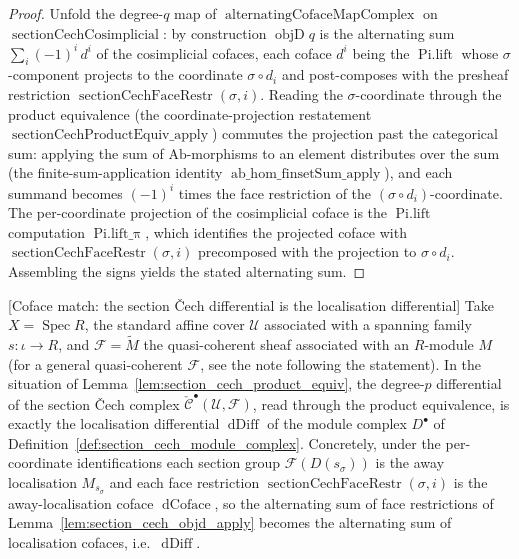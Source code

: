 \begin{proof}
  Unfold the degree-\(q\) map of \(\operatorname{alternatingCofaceMapComplex}\) on
  \(\operatorname{sectionCechCosimplicial}\): by construction \(\operatorname{objD} q\)
  is the alternating sum \(\sum_{i} (-1)^i\, d^i\) of the cosimplicial cofaces, each
  coface \(d^i\) being the \(\operatorname{Pi.lift}\) whose \(\sigma\)-component
  projects to the coordinate \(\sigma \circ d_i\) and post-composes with the presheaf
  restriction \(\operatorname{sectionCechFaceRestr}(\sigma, i)\). Reading the
  \(\sigma\)-coordinate through the product equivalence (the coordinate-projection
  restatement \(\operatorname{sectionCechProductEquiv\_apply}\)) commutes the projection
  past the categorical sum: applying the sum of \(\mathrm{Ab}\)-morphisms to an element
  distributes over the sum (the finite-sum-application identity
  \(\operatorname{ab\_hom\_finsetSum\_apply}\)), and each summand becomes
  \((-1)^i\) times the face restriction of the \((\sigma \circ d_i)\)-coordinate. The
  per-coordinate projection of the cosimplicial coface is the \(\operatorname{Pi.lift}\)
  computation \(\operatorname{Pi.lift\_π}\), which identifies the projected coface with
  \(\operatorname{sectionCechFaceRestr}(\sigma, i)\) precomposed with the projection to
  \(\sigma \circ d_i\). Assembling the signs yields the stated alternating sum.
\end{proof}

\begin{lemma}

[Coface match: the section {\v C}ech differential is the localisation differential]
  \label{lem:section_cech_coface_match}
  Take \(X = \operatorname{Spec} R\), the standard affine cover \(\mathcal{U}\)
  associated with a spanning family \(s : \iota \to R\), and \(\mathcal{F} =
  \widetilde{M}\) the quasi-coherent sheaf associated with an \(R\)-module \(M\)
  (for a general quasi-coherent \(\mathcal{F}\), see the note following the statement). In
  the situation of Lemma~\ref{lem:section_cech_product_equiv}, the degree-\(p\)
  differential of the section {\v C}ech complex
  \(\check{\mathcal{C}}^\bullet(\mathcal{U}, \mathcal{F})\), read through the product
  equivalence, is exactly the localisation differential \(\operatorname{dDiff}\) of the
  module complex \(D^\bullet\) of Definition~\ref{def:section_cech_module_complex}.
  Concretely, under the per-coordinate identifications each section group
  \(\mathcal{F}(D(s_\sigma))\) is the away localisation \(M_{s_\sigma}\) and each face
  restriction \(\operatorname{sectionCechFaceRestr}(\sigma, i)\) is the away-localisation
  coface \(\operatorname{dCoface}\), so the alternating sum of face restrictions of
  Lemma~\ref{lem:section_cech_objd_apply} becomes the alternating sum of localisation
  cofaces, i.e.\ \(\operatorname{dDiff}\).
\end{lemma}

